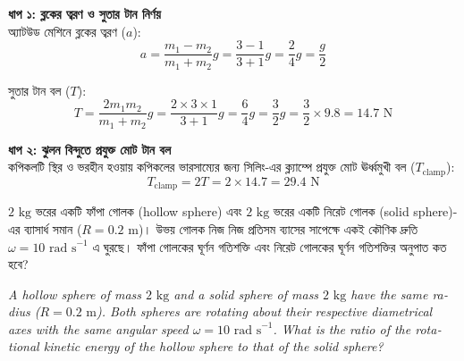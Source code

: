 \documentclass[12pt, a4paper]{article}
\begin{document}
\begin{tcolorbox}[solutionbox={সমাধান (Solution)}]
    \noindent
    \textbf{ধাপ ১: ব্লকের ত্বরণ ও সুতার টান নির্ণয়} \\
    অ্যাটউড মেশিনে ব্লকের ত্বরণ ($a$):
    \[ a = \frac{m_1 - m_2}{m_1 + m_2} g = \frac{3 - 1}{3 + 1} g = \frac{2}{4} g = \frac{g}{2} \]
    
    সুতার টান বল ($T$):
    \[ T = \frac{2 m_1 m_2}{m_1 + m_2} g = \frac{2 \times 3 \times 1}{3 + 1} g = \frac{6}{4} g = \frac{3}{2} g = \frac{3}{2} \times 9.8 = 14.7\text{ N} \]
    
    \vspace{0.5em}
    \noindent\textbf{ধাপ ২: ঝুলন বিন্দুতে প্রযুক্ত মোট টান বল} \\
    কপিকলটি স্থির ও ভরহীন হওয়ায় কপিকলের ভারসাম্যের জন্য সিলিং-এর ক্ল্যাম্পে প্রযুক্ত মোট ঊর্ধ্বমুখী বল ($T_{\text{clamp}}$):
    \[ T_{\text{clamp}} = 2T = 2 \times 14.7 = \mathbf{29.4}\text{ N} \]
\end{tcolorbox}

\newpage

\begin{tcolorbox}[questionbox={প্রশ্ন (Question) 10}]
    \noindent
    $2\text{ kg}$ ভরের একটি ফাঁপা গোলক (hollow sphere) এবং $2\text{ kg}$ ভরের একটি নিরেট গোলক (solid sphere)-এর ব্যাসার্ধ সমান ($R = 0.2\text{ m}$)। উভয় গোলক নিজ নিজ প্রতিসম ব্যাসের সাপেক্ষে একই কৌণিক দ্রুতি $\omega = 10\text{ rad s}^{-1}$ এ ঘুরছে। ফাঁপা গোলকের ঘূর্ণন গতিশক্তি এবং নিরেট গোলকের ঘূর্ণন গতিশক্তির অনুপাত কত হবে?
    
    \vspace{0.8em}
    \begin{english}
    \noindent\textit{\color{darkgray}
    A hollow sphere of mass $2\text{ kg}$ and a solid sphere of mass $2\text{ kg}$ have the same radius ($R = 0.2\text{ m}$). Both spheres are rotating about their respective diametrical axes with the same angular speed $\omega = 10\text{ rad s}^{-1}$. What is the ratio of the rotational kinetic energy of the hollow sphere to that of the solid sphere?
    }
    \end{english}
\end{tcolorbox}
\end{document}
